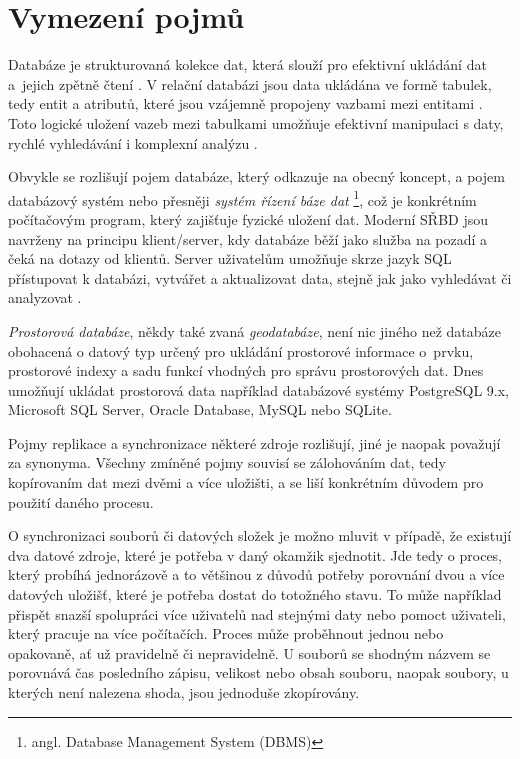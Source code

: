 \section{Vymezení pojmů}
\label{kVymezeniPojmu}

Databáze je strukturovaná kolekce dat, která slouží pro efektivní ukládání dat a~jejich zpětně čtení \cite{Oppel2009}. V relační databázi jsou data ukládána ve formě tabulek, tedy entit a atributů, které jsou vzájemně propojeny vazbami mezi entitami \cite{Connolly2005}. Toto logické uložení vazeb mezi tabulkami umožňuje efektivní manipulaci s daty, rychlé vyhledávání i komplexní analýzu \cite{Momjian2001}. 

Obvykle se rozlišují pojem databáze, který odkazuje na obecný koncept, a pojem databázový systém nebo přesněji {\it systém řízení báze dat} \footnote{angl. Database Management System (DBMS)}, což je konkrétním počítačovým program, který zajišťuje fyzické uložení dat. Moderní SŘBD jsou navrženy na principu klient/server, kdy databáze běží jako služba na pozadí a čeká na dotazy od klientů. Server uživatelům umožňuje skrze jazyk SQL přístupovat k databázi, vytvářet a aktualizovat data, stejně jak jako vyhledávat či analyzovat \cite{Connolly2005}.

{\it Prostorová databáze}, někdy také zvaná {\it geodatabáze}, není nic jiného než databáze obohacená o datový typ určený pro ukládání prostorové informace o~prvku, prostorové indexy a sadu funkcí vhodných pro správu prostorových dat. Dnes umožňují ukládat prostorová data například databázové systémy PostgreSQL 9.x, Microsoft SQL Server, Oracle Database, MySQL nebo SQLite. 

Pojmy replikace a synchronizace některé zdroje rozlišují, jiné je naopak po\-va\-žu\-jí za synonyma. Všechny zmíněné pojmy souvisí se zálohováním dat, tedy kopírovaním dat mezi dvěmi a více uložišti, a se liší konkrétním důvodem pro použití daného procesu. 

O synchronizaci souborů či datových složek je možno mluvit v případě, že existují dva datové zdroje, které je potřeba v daný okamžik sjednotit. Jde tedy o proces, který probíhá jednorázově a to většinou z důvodů potřeby porovnání dvou a více datových uložišť, které je potřeba dostat do totožného stavu. To může například přispět snazší spolupráci více uživatelů nad stejnými daty nebo pomoct uživateli, který pracuje na více počítačích. Proces může proběhnout jednou nebo opakovaně, ať už pravidelně či nepravidelně. U souborů se shodným názvem se porovnává čas posledního zápisu, velikost nebo obsah souboru, naopak soubory, u kterých není nalezena shoda, jsou jednoduše zkopírovány. 

